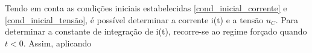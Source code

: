 \documentclass[a4paper, titlepage, portuguese]{article}
\begin{document}
		Tendo em conta as condições iniciais estabelecidas \ref{cond_inicial_corrente} e \ref{cond_inicial_tensão}, é possível determinar a corrente i(t) e a tensão $u_{C}$. Para determinar a constante de integração de i(t), recorre-se ao regime forçado quando $t < 0$. Assim, aplicando 
		
	\subsubsection{}



\end{document}
